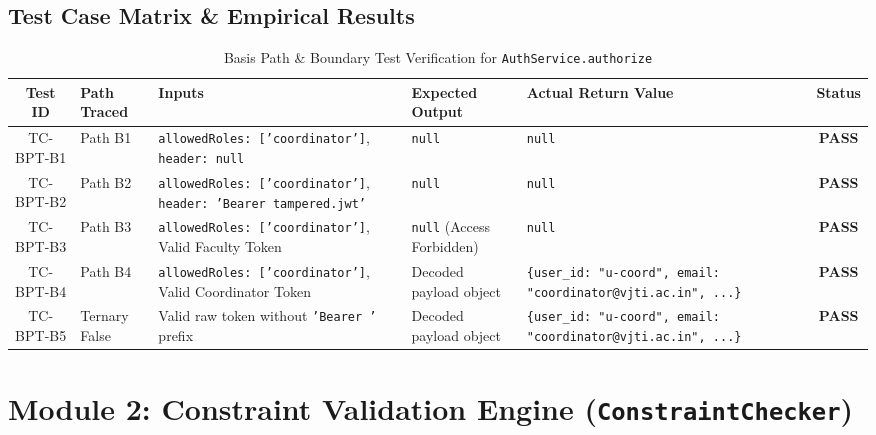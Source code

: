 \documentclass[11pt,a4paper]{article}
\begin{document}
\subsection{Test Case Matrix \& Empirical Results}
\begin{table}[H]
\centering
\scriptsize
\begin{tabular}{@{}clp{3.2cm}p{3.5cm}p{3.5cm}c@{}}
\toprule
\textbf{Test ID} & \textbf{Path Traced} & \textbf{Inputs} & \textbf{Expected Output} & \textbf{Actual Return Value} & \textbf{Status} \\ \midrule
TC-BPT-B1 & Path B1 & \texttt{allowedRoles: ['coordinator']}, \texttt{header: null} & \texttt{null} & \texttt{null} & \textbf{PASS} \\
TC-BPT-B2 & Path B2 & \texttt{allowedRoles: ['coordinator']}, \texttt{header: 'Bearer tampered.jwt'} & \texttt{null} & \texttt{null} & \textbf{PASS} \\
TC-BPT-B3 & Path B3 & \texttt{allowedRoles: ['coordinator']}, Valid Faculty Token & \texttt{null} (Access Forbidden) & \texttt{null} & \textbf{PASS} \\
TC-BPT-B4 & Path B4 & \texttt{allowedRoles: ['coordinator']}, Valid Coordinator Token & Decoded payload object & \texttt{\{user\_id: "u-coord", email: "coordinator@vjti.ac.in", ...\}} & \textbf{PASS} \\
TC-BPT-B5 & Ternary False & Valid raw token without \texttt{'Bearer '} prefix & Decoded payload object & \texttt{\{user\_id: "u-coord", email: "coordinator@vjti.ac.in", ...\}} & \textbf{PASS} \\ \bottomrule
\end{tabular}
\caption{Basis Path \& Boundary Test Verification for \texttt{AuthService.authorize}}
\end{table}

\newpage
\section{Module 2: Constraint Validation Engine (\texttt{ConstraintChecker})}
\end{document}

